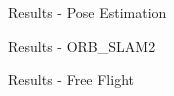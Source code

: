 \begin{frame}{Results - Pose Estimation}
\end{frame}

\begin{frame}{Results - ORB\_SLAM2}

\end{frame}


\begin{frame}{Results - Free Flight}
\end{frame}


